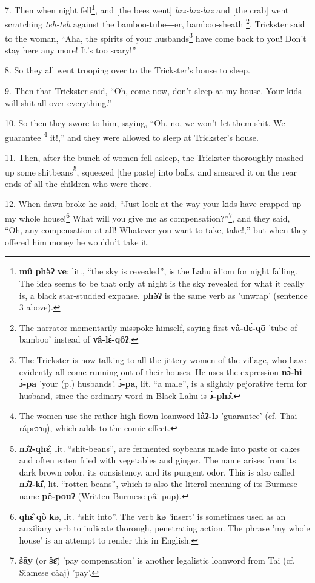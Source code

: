7. Then when night fell\footnote{\textbf{mû} \textbf{phə̀ʔ} \textbf{ve}: lit., ``the sky is revealed'', is the Lahu idiom for night falling. The idea seems to be that only at night is the sky revealed for what it really is, a black star-studded expanse. \textbf{phə̀ʔ} is the same verb as 'unwrap' (sentence 3 above).}, and [the bees went] \textit{bzz-bzz-bzz }and [the
crab] went scratching \textit{teh-teh }against the bamboo-tube―er, bamboo-sheath
\footnote{The narrator momentarily misspoke himself, saying first \textbf{vâ-dɛ́-qō} 'tube of bamboo' instead of \textbf{vâ-lɛ́-qôʔ}.}, Trickster said to the woman, ``Aha, the spirits of your husbands\footnote{The Trickster is now talking to all the jittery women of the village, who have evidently all come running out of their houses. He uses the expression \textbf{nɔ̀-hɨ} \textbf{ɔ̀-pā} 'your (p.) husbands'. \textbf{ɔ̀-pā}, lit. ``a male'', is a slightly pejorative term for husband, since the ordinary word in Black Lahu is \textbf{ɔ̀-phɔ̂}.} have
come back to you! Don't stay here any more! It's too scary!''

8. So they all went trooping over to the Trickster's house to sleep.

9. Then that Trickster said, ``Oh, come now, don't sleep at my house. Your kids
will shit all over everything.''

10. So then they swore to him, saying, ``Oh, no, we won't let them shit. We guarantee
\footnote{The women use the rather high-flown loanword \textbf{lâʔ-lɔ} 'guarantee' (cf. Thai ráprɔɔŋ), which adds to the comic effect.} it!,'' and they were allowed to sleep at Trickster's house.

11. Then, after the bunch of women fell asleep, the Trickster thoroughly mashed
up some shitbeans\footnote{\textbf{nɔ̂ʔ-qhɛ̂}, lit. ``shit-beans'', are fermented soybeans made into paste or cakes and often eaten fried with vegetables and ginger. The name arises from its dark brown color, its consistency, and its pungent odor. This is also called \textbf{nɔ̂ʔ-kɨ̂}, lit. ``rotten beans'', which is also the literal meaning of its Burmese name \textbf{pê-pouʔ} (Written Burmese pâi-pup).}, squeezed [the paste] into balls, and smeared it on the
rear ends of all the children who were there.

12. When dawn broke he said, ``Just look at the way your kids have crapped up my
whole house!\footnote{\textbf{qhɛ̂} \textbf{qò} \textbf{kə}, lit. ``shit into''. The verb \textbf{kə} 'insert' is sometimes used as an auxiliary verb to indicate thorough, penetrating action. The phrase 'my whole house' is an attempt to render this in English.} What will you give me as compensation?''\footnote{\textbf{šāy} (or \textbf{šɛ̄}) 'pay compensation' is another legalistic loanword from Tai (cf. Siamese càaj) 'pay'.}, and they said,
``Oh, any compensation at all! Whatever you want to take, take!,'' but when they
offered him money he wouldn't take it.

